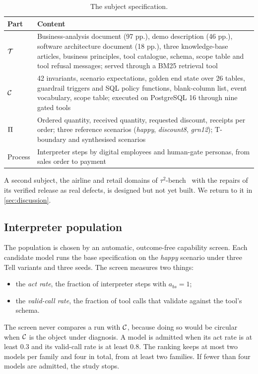 \begin{table}[t]
\caption{The subject specification.}
\label{tab:subject}
\small
\begin{tabular}{@{}lp{10.6cm}@{}}
\toprule
Part & Content \\
\midrule
$\mathcal{T}$ & Business-analysis document (97 pp.), demo description (46 pp.), software architecture document (18 pp.), three knowledge-base articles, business principles, tool catalogue, schema, scope table and tool refusal messages; served through a BM25 retrieval tool \\
$\mathcal{C}$ & 42 invariants, scenario expectations, golden end state over 26 tables, guardrail triggers and SQL policy functions, blank-column list, event vocabulary, scope table; executed on PostgreSQL 16 through nine gated tools \\
$\Pi$ & Ordered quantity, received quantity, requested discount, receipts per order; three reference scenarios (\textit{happy}, \textit{discount8}, \textit{grn12}); T-boundary and synthesised scenarios \\
Process & Interpreter steps by digital employees and human-gate personas, from sales order to payment \\
\bottomrule
\end{tabular}
\end{table}

A second subject, the airline and retail domains of $\tau^2$-bench~\cite{barres2026bench} with the repairs of its verified release as real defects, is designed but not yet built. We return to it in \cref{sec:discussion}.

\subsection{Interpreter population}

The population is chosen by an automatic, outcome-free capability screen. Each candidate model runs the base specification on the \textit{happy} scenario under three Tell variants and three seeds. The screen measures two things:
\begin{itemize}[leftmargin=*]
\item the \emph{act rate}, the fraction of interpreter steps with $a_{bs}=1$;
\item the \emph{valid-call rate}, the fraction of tool calls that validate against the tool's schema.
\end{itemize}
The screen never compares a run with $\mathcal{C}$, because doing so would be circular when $\mathcal{C}$ is the object under diagnosis. A model is admitted when its act rate is at least $0.3$ and its valid-call rate is at least $0.8$. The ranking keeps at most two models per family and four in total, from at least two families. If fewer than four models are admitted, the study stops.

